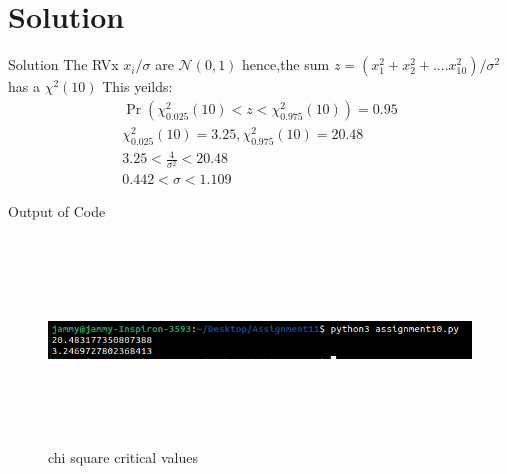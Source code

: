 \documentclass{beamer}
\providecommand{\pr}[1]{\ensuremath{\Pr\left(#1\right)}}
\providecommand{\brak}[1]{\ensuremath{\left(#1\right)}}
\begin{document}
	\section{Solution}
	\begin{frame}{Solution}
	The RVx $x_i/\sigma$ are $\mathcal{N}\brak{0,1}$ hence,the sum $z=\brak{x_1^2+x_2^2+....x_{10} ^{2}}/\sigma^{2}$ has a $\chi^{2} \brak{10}$ This yeilds:
	\begin{align}
	\pr{\chi_{0.025}^{2}\brak{10} < z < \chi_{0.975}^{2}\brak{10} }=0.95  \\
	\chi_{0.025}^{2}\brak{10}=3.25 ,\chi_{0.975}^{2}\brak{10}=20.48 \\
	3.25<\frac{4}{\sigma^2}<20.48 \\
	0.442< \sigma <1.109
	\end{align}
 	\end{frame}
 	\begin{frame}{Output of Code}
 	\begin{figure}[!ht]
		\centering
			\includegraphics[width=\textwidth,height=5.5cm,keepaspectratio]{figs/output.png}
		\caption{chi square critical values}
		\label{Fig 0:}
	\end{figure}
 	\end{frame}
\end{document}

